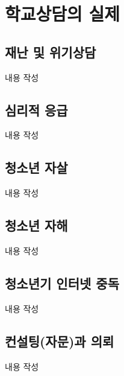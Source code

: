 \section{학교상담의 실제}

\subsection{재난 및 위기상담}
내용 작성

\subsection{심리적 응급}
내용 작성

\subsection{청소년 자살}
내용 작성

\subsection{청소년 자해}
내용 작성

\subsection{청소년기 인터넷 중독}
내용 작성

\subsection{컨설팅(자문)과 의뢰}
내용 작성
